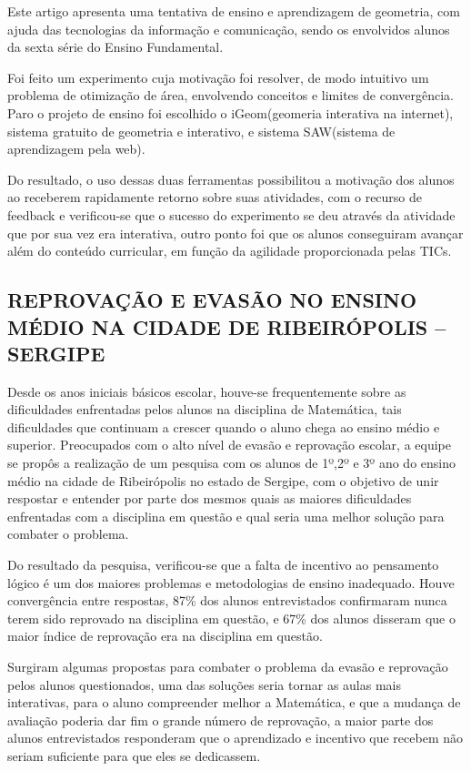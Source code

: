 \documentclass[12pt,a4paper]{article}
\begin{document}
Este artigo apresenta uma tentativa de ensino e aprendizagem de geometria, com ajuda das tecnologias da informação e comunicação, sendo os envolvidos alunos da sexta série do Ensino Fundamental. 

Foi feito um experimento cuja motivação foi resolver, de modo intuitivo um problema de otimização de área, envolvendo conceitos e limites de convergência. Paro o projeto de ensino foi escolhido o iGeom(geomeria interativa na internet), sistema gratuito de geometria e interativo, e sistema SAW(sistema de aprendizagem pela web).

Do resultado, o uso dessas duas ferramentas possibilitou a motivação dos alunos ao receberem rapidamente retorno sobre suas atividades, com o recurso de feedback e verificou-se que o sucesso do experimento se deu através da atividade que por sua vez era interativa, outro ponto foi que os alunos conseguiram avançar além do conteúdo curricular, em função da agilidade proporcionada pelas TICs.\citep{tanbellini2010uso}

\subsection{REPROVAÇÃO E EVASÃO NO ENSINO MÉDIO NA CIDADE DE  RIBEIRÓPOLIS – SERGIPE}
Desde os anos iniciais básicos escolar, houve-se frequentemente sobre as dificuldades enfrentadas pelos alunos na disciplina de Matemática, tais dificuldades que continuam a crescer quando o aluno chega ao ensino médio e superior. Preocupados com o alto nível de evasão e reprovação escolar, a equipe se propôs a realização de um pesquisa com os alunos de 1º,2º e 3º ano do ensino médio na cidade de Ribeirópolis no estado de Sergipe, com o objetivo de unir respostar e entender por parte dos mesmos quais as maiores dificuldades enfrentadas com a disciplina em questão e qual seria uma melhor solução para combater o problema.

Do resultado da pesquisa, verificou-se que a falta de incentivo ao pensamento lógico é um dos maiores problemas e metodologias de ensino inadequado. Houve convergência entre respostas, 87\% dos alunos entrevistados confirmaram nunca terem sido reprovado na disciplina em questão, e 67\% dos alunos disseram que o maior índice de reprovação era na disciplina em questão. 

Surgiram algumas propostas para combater o problema da evasão e reprovação pelos alunos questionados, uma das soluções seria tornar as aulas mais interativas, para o aluno compreender melhor a Matemática, e que a mudança de avaliação poderia dar fim o grande número de reprovação, a maior parte dos alunos entrevistados responderam que o aprendizado e incentivo que recebem não seriam suficiente para que eles se dedicassem. 
\end{document}
